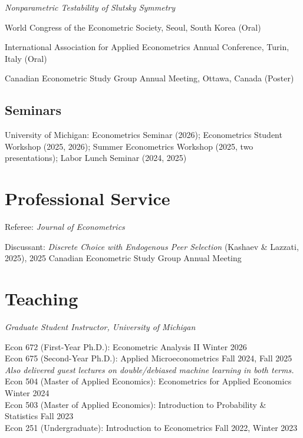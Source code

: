 \documentclass[11pt]{article}
\begin{document}
\vspace{0.5em}
\textit{Nonparametric Testability of Slutsky Symmetry}
\begin{dated}
\item[2025] World Congress of the Econometric Society, Seoul, South Korea (Oral)
\item[2025] International Association for Applied Econometrics Annual Conference, Turin, Italy (Oral)
\item[2025] Canadian Econometric Study Group Annual Meeting, Ottawa, Canada (Poster)
\end{dated}

\subsection*{Seminars}
University of Michigan: Econometrics Seminar (2026); Econometrics Student Workshop (2025, 2026); Summer Econometrics Workshop (2025, two presentations); Labor Lunch Seminar (2024, 2025)

\section*{Professional Service}
\begin{hang}
\item Referee: \textit{Journal of Econometrics}
\item Discussant: \textit{Discrete Choice with Endogenous Peer Selection} (Kashaev \& Lazzati, 2025), 2025 Canadian Econometric Study Group Annual Meeting
\end{hang}

\section*{Teaching}
\textit{Graduate Student Instructor, University of Michigan}

\vspace{0.3em}
Econ 672 (First-Year Ph.D.): Econometric Analysis II \hfill Winter 2026 \\
Econ 675 (Second-Year Ph.D.): Applied Microeconometrics \hfill Fall 2024, Fall 2025 \\
\hspace*{1.25em}\textit{Also delivered guest lectures on double/debiased machine learning in both terms.} \\
Econ 504 (Master of Applied Economics): Econometrics for Applied Economics \hfill Winter 2024 \\
Econ 503 (Master of Applied Economics): Introduction to Probability \& Statistics \hfill Fall 2023 \\
Econ 251 (Undergraduate): Introduction to Econometrics \hfill Fall 2022, Winter 2023
\end{document}
